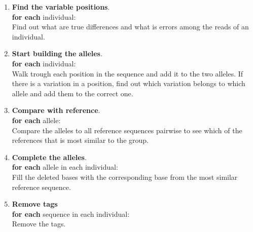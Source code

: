 \begin{itemize}
	\begin{enumerate}
		\item \textbf{Find the variable positions}.\\
		\textbf{for each} individual:\\
		Find out what are true differences and what is errors among the reads of an individual.
		\item \textbf{Start building the alleles}.\\
		\textbf{for each} individual:\\
		Walk trough each position in the sequence and add it to the two alleles. If there is a variation in a position, find out which variation belongs to which allele and add them to the correct one. 
		\item \textbf{Compare with reference}.\\
		\textbf{for each} allele:\\
		Compare the alleles to all reference sequences pairwise to see which of the references that is most similar to the group.
		\item \textbf{Complete the alleles}.\\
		\textbf{for each} allele in each individual:\\
		Fill the deleted bases with the corresponding base from the most similar reference sequence.
		\item \textbf{Remove tags}\\
		\textbf{for each} sequence in each individual:\\
		Remove the tags.
	\end{enumerate}	
\end{itemize}
